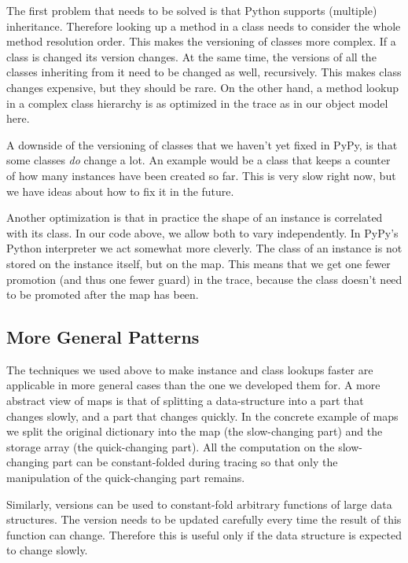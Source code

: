 \documentclass{sig-alternate}
\begin{document}
The first problem that needs to be solved is that Python supports (multiple)
inheritance. Therefore looking up a method in a class needs to consider the
whole method resolution order. This makes the versioning of classes more
complex. If a class is changed its version changes. At the same time, the
versions of all the classes inheriting from it need to be changed as well,
recursively. This makes class changes expensive, but they should be rare.  On the
other hand, a method lookup in a complex class hierarchy is as optimized in the
trace as in our object model here.

A downside of the versioning of classes that we haven't yet fixed in PyPy, is
that some classes \emph{do} change a lot. An example would be a class that keeps a
counter of how many instances have been created so far. This is very slow right
now, but we have ideas about how to fix it in the future.

Another optimization is that in practice the shape of an instance is correlated
with its class. In our code above, we allow both to vary independently.
In PyPy's Python interpreter we act somewhat more cleverly. The class of
an instance is not stored on the instance itself, but on the map. This means
that we get one fewer promotion (and thus one fewer guard) in the trace, because the class doesn't need to
be promoted after the map has been.



\subsection{More General Patterns}

The techniques we used above to make instance and class lookups faster are
applicable in more general cases than the one we developed them for. A more
abstract view of maps is that of splitting a data-structure into a part that
changes slowly, and a part that changes quickly. In the concrete example of maps
we split the original dictionary into the map (the slow-changing part) and the
storage array (the quick-changing part). All the computation on the
slow-changing part can be constant-folded during tracing so that only the
manipulation of the quick-changing part remains.

Similarly, versions can be used to constant-fold arbitrary functions of large data
structures. The version needs to be updated carefully every time the result of
this function can change. Therefore this is useful only if the data structure is
expected to change slowly.
\end{document}
